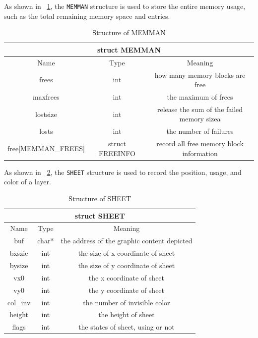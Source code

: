 \documentclass{swfcthesis}
\begin{document}
As shown in ~\ref{tab:MEMMAN}, the \texttt{MEMMAN} structure is used to store the entire
memory usage, such as the total remaining memory space and entries.
\begin{table}[!htbp]
  \centering
  \begin{tabular}[c]{|c|c|c|}
    \hline
    \multicolumn{3}{|c|}{struct MEMMAN} \\
    \hline
    Name & Type & Meaning \\
    \hline
    frees & int & how many memory blocks are free \\
    \hline
    maxfrees & int & the maximum of frees \\
    \hline
    lostsize & int & release the sum of the failed memory sizea \\
    \hline
    losts & int & the number of failures \\
    \hline
    free[MEMMAN\_FREES] & struct FREEINFO & record all free memory block information \\
    \hline
    
  \end{tabular}
  \caption{Structure of MEMMAN}
  \label{tab:MEMMAN}
\end{table}

As shown in ~\ref{tab:SHEET}, the \texttt{SHEET} structure is used to record the position,
usage, and color of a layer.


\begin{table}[!htbp]
  \centering
  \begin{tabular}{|c|c|c|}
    \hline
    \multicolumn{3}{|c|}{struct SHEET} \\
    \hline
    Name & Type & Meaning \\
    \hline
    buf & char* & the address of the graphic content depicted \\
    \hline
    bxszie & int & the size of x coordinate of sheet \\
    \hline
    bysize & int & the size of y coordinate of sheet \\
    \hline
    vx0 & int & the x coordinate of sheet \\
    \hline
    vy0 & int & the y coordinate of sheet \\
    \hline
    col\_inv & int & the number of invisible color \\
    \hline
    height & int & the height of sheet \\
    \hline
    flags & int & the states of sheet, using or not \\
    \hline
  \end{tabular}
  \caption{Structure of SHEET}
  \label{tab:SHEET}
\end{table}
\end{document}
